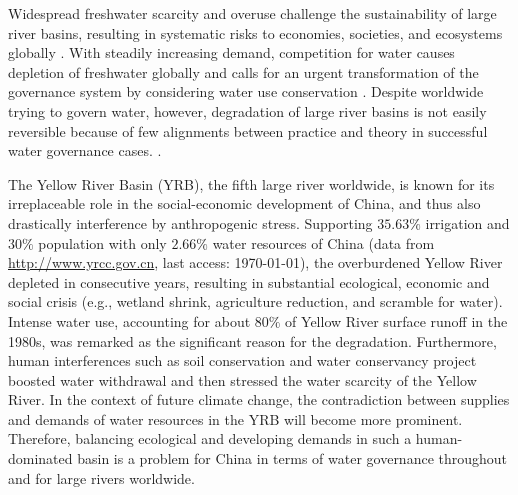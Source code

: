 Widespread freshwater scarcity and overuse challenge the sustainability of large river basins, resulting in systematic risks to economies, societies, and ecosystems globally \cite{distefano2017, dolan2021, xu2020b, mekonnen2016}.
With steadily increasing demand, competition for water causes depletion of freshwater globally and calls for an urgent transformation of the governance system by considering water use conservation \cite{gleick2010, ziolkowska2016, wang2019d}.
Despite worldwide trying to govern water, however, degradation of large river basins is not easily reversible because of few alignments between practice and theory in successful water governance cases.
\cite{giuliani2013, falkenmark2019, jaeger2019}.

The Yellow River Basin (YRB), the fifth large river worldwide, is known for its irreplaceable role in the social-economic development of China, and thus also drastically interference by anthropogenic stress.
Supporting $35.63\%$ irrigation and $30\%$ population with only $2.66\%$ water resources of China (data from \href{http://www.yrcc.gov.cn}{http://www.yrcc.gov.cn}, last access: \today), the overburdened Yellow River depleted in consecutive years, resulting in substantial ecological, economic and social crisis (e.g., wetland shrink, agriculture reduction, and scramble for water).
Intense water use, accounting for about $80\%$ of Yellow River surface runoff in the 1980s, was remarked as the significant reason for the degradation.
Furthermore, human interferences such as soil conservation and water conservancy project boosted water withdrawal and then stressed the water scarcity of the Yellow River.
In the context of future climate change, the contradiction between supplies and demands of water resources in the YRB will become more prominent.
Therefore, balancing ecological and developing demands in such a human-dominated basin is a problem for China in terms of water governance throughout and for large rivers worldwide.

